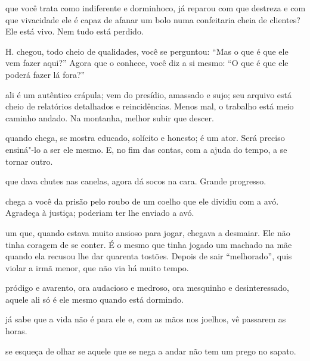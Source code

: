 \pagebreak
\thispagestyle{empty}
\movetooddpage

 que você trata como indiferente e dorminhoco, já reparou com que
destreza e com que vivacidade ele é capaz de afanar um bolo numa
confeitaria cheia de clientes? Ele está vivo. Nem tudo está perdido.



 H. chegou, todo cheio de qualidades, você se perguntou: ``Mas o
que é que ele vem fazer aqui?'' Agora que o conhece, você diz a si
mesmo: ``O que é que ele poderá fazer lá fora?''



 ali é um autêntico crápula; vem do presídio, amassado e sujo; seu
arquivo está cheio de relatórios detalhados e reincidências. Menos mal,
o trabalho está meio caminho andado. Na montanha, melhor subir que
descer.



 quando chega, se mostra educado, solícito e honesto; é um ator. Será
preciso ensiná"-lo a ser ele mesmo. E, no fim das contas, com a ajuda do
tempo, a se tornar outro.



 que dava chutes nas canelas, agora dá socos na cara. Grande
progresso.

\pagebreak

 chega a você da prisão pelo roubo de um coelho que ele dividiu com a
avó. Agradeça à justiça; poderiam ter lhe enviado a avó.



 um que, quando estava muito ansioso para jogar, chegava a
desmaiar. Ele não tinha coragem de se conter. É o mesmo que tinha jogado
um machado na mãe quando ela recusou lhe dar quarenta tostões. Depois de
sair ``melhorado'', quis violar a irmã menor, que não via há muito
tempo.



 pródigo e avarento, ora audacioso e medroso, ora mesquinho e
desinteressado, aquele ali só é ele mesmo quando está dormindo.



 já sabe que a vida não é para ele e, com as mãos nos joelhos, vê
passarem as horas.



 se esqueça de olhar se aquele que se nega a andar não tem um prego
no sapato.



